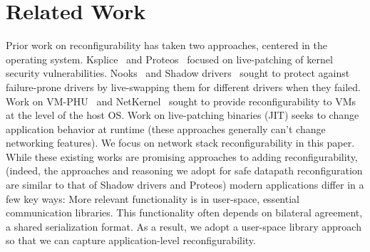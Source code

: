 \section{Related Work}\label{s:relwork}

\begin{outline}
\1 Prior work on reconfigurability has taken two approaches, centered in the operating system.
    \2 Ksplice~\cite{ksplice https://dl.acm.org/doi/abs/10.1145/1519065.1519085} and Proteos~\cite{proteos-tennenbaum https://dl.acm.org/doi/abs/10.1145/2499368.2451147} focused on live-patching of kernel security vulnerabilities.
    \2 Nooks~\cite{nooks https://dl.acm.org/doi/abs/10.1145/1047915.1047919} and Shadow drivers~\cite{shadow-drivers https://dl.acm.org/doi/abs/10.1145/1189256.1189257} sought to protect against failure-prone drivers by live-swapping them for different drivers when they failed.
    \2 Work on VM-PHU~\cite{vm-phu https://dl.acm.org/doi/pdf/10.1145/3447786.3456232} and NetKernel~\cite{netkernel https://dl.acm.org/doi/10.1145/3152434.3152442} sought to provide reconfigurability to VMs at the level of the host OS.
    \2 Work on live-patching binaries (\eg JIT) seeks to change application behavior at runtime (these approaches generally can't change networking features).
    \2 We focus on network stack reconfigurability in this paper. While these existing works are promising approaches to adding reconfigurability,
      \3 (indeed, the approaches and reasoning we adopt for safe datapath reconfiguration are similar to that of Shadow drivers and Proteos)
    \2 modern applications differ in a few key ways:
      \3 More relevant functionality is in user-space, \ie essential communication libraries.
      \3 This functionality often depends on bilateral agreement, \eg a shared serialization format.
    \2 As a result, we adopt a user-space library approach so that we can capture application-level reconfigurability.


\end{outline}
